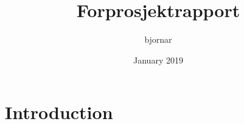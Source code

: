 \documentclass{article}
\title{Forprosjektrapport}
\author{bjornar }
\date{January 2019}
\begin{document}
\maketitle

\section{Introduction}
\end{document}
